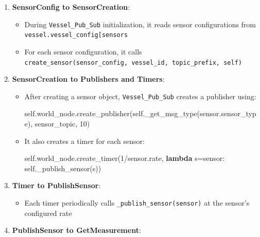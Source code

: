 \documentclass[
  letterpaper,
  DIV=11,
  numbers=noendperiod]{scrreprt}
\newenvironment{Shaded}{\begin{snugshade}}{\end{snugshade}}
\newcommand{\DecValTok}[1]{\textcolor[rgb]{0.68,0.00,0.00}{#1}}
\newcommand{\KeywordTok}[1]{\textcolor[rgb]{0.00,0.23,0.31}{\textbf{#1}}}
\newcommand{\NormalTok}[1]{\textcolor[rgb]{0.00,0.23,0.31}{#1}}
\newcommand{\OperatorTok}[1]{\textcolor[rgb]{0.37,0.37,0.37}{#1}}
\newcommand{\VariableTok}[1]{\textcolor[rgb]{0.07,0.07,0.07}{#1}}
\providecommand{\tightlist}{%
  \setlength{\itemsep}{0pt}\setlength{\parskip}{0pt}}\usepackage{longtable,booktabs,array}
\begin{document}
\begin{enumerate}
\def\labelenumi{\arabic{enumi}.}
\tightlist
\item
  \textbf{SensorConfig to SensorCreation}:

  \begin{itemize}
  \tightlist
  \item
    During \texttt{Vessel\_Pub\_Sub} initialization, it reads sensor
    configurations from
    \texttt{vessel.vessel\_config{[}\textquotesingle{}sensors\textquotesingle{}{]}}
  \item
    For each sensor configuration, it calls
    \texttt{create\_sensor(sensor\_config,\ vessel\_id,\ topic\_prefix,\ self)}
  \end{itemize}
\item
  \textbf{SensorCreation to Publishers and Timers}:

  \begin{itemize}
  \item
    After creating a sensor object, \texttt{Vessel\_Pub\_Sub} creates a
    publisher using:

\begin{Shaded}
\begin{Highlighting}[]
\VariableTok{self}\NormalTok{.world\_node.create\_publisher(}\VariableTok{self}\NormalTok{.\_get\_msg\_type(sensor.sensor\_type), sensor\_topic, }\DecValTok{10}\NormalTok{)}
\end{Highlighting}
\end{Shaded}
  \item
    It also creates a timer for each sensor:

\begin{Shaded}
\begin{Highlighting}[]
\VariableTok{self}\NormalTok{.world\_node.create\_timer(}\DecValTok{1}\OperatorTok{/}\NormalTok{sensor.rate, }\KeywordTok{lambda}\NormalTok{ s}\OperatorTok{=}\NormalTok{sensor: }\VariableTok{self}\NormalTok{.\_publish\_sensor(s))}
\end{Highlighting}
\end{Shaded}
  \end{itemize}
\item
  \textbf{Timer to PublishSensor}:

  \begin{itemize}
  \tightlist
  \item
    Each timer periodically calls \texttt{\_publish\_sensor(sensor)} at
    the sensor's configured rate
  \end{itemize}
\item
  \textbf{PublishSensor to GetMeasurement}:


\end{enumerate}
\end{document}
